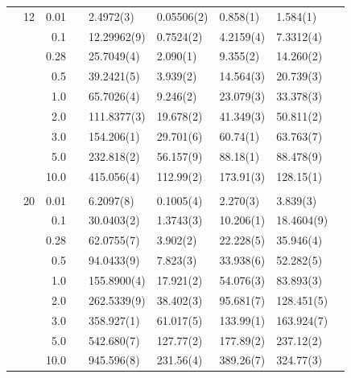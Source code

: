 \begin{table}[H]
\begin{tabularx}{\textwidth}{R{1cm}rrcR{2.3cm}R{2.3cm}R{2.3cm}R{2.3cm}R{1cm}}
		&12 & 0.01 && 2.4972(3) & 0.05506(2) & 0.858(1) & 1.584(1)\\
		&& 0.1 && 12.29962(9) & 0.7524(2) & 4.2159(4) & 7.3312(4) \\
		&& 0.28 && 25.7049(4) & 2.090(1) & 9.355(2) & 14.260(2) \\
		&& 0.5 && 39.2421(5) & 3.939(2) & 14.564(3) & 20.739(3) \\
		&& 1.0 && 65.7026(4) & 9.246(2) & 23.079(3) & 33.378(3) \\
		&& 2.0 && 111.8377(3) & 19.678(2) & 41.349(3) & 50.811(2) \\
		&& 3.0 && 154.206(1) & 29.701(6) & 60.74(1) & 63.763(7) \\ 
		&& 5.0 && 232.818(2) & 56.157(9) & 88.18(1) & 88.478(9) \\
		&& 10.0 && 415.056(4) & 112.99(2) & 173.91(3) & 128.15(1) \\
		\hline \\
		
		&20 & 0.01 && 6.2097(8) & 0.1005(4) & 2.270(3) & 3.839(3) \\
		&& 0.1 && 30.0403(2) & 1.3743(3) & 10.206(1) & 18.4604(9) \\
		&& 0.28 && 62.0755(7) & 3.902(2) & 22.228(5) & 35.946(4) \\
		&& 0.5 && 94.0433(9) & 7.823(3) & 33.938(6) & 52.282(5) \\
		&& 1.0 && 155.8900(4) & 17.921(2) & 54.076(3) & 83.893(3) \\
		&& 2.0 && 262.5339(9) & 38.402(3) & 95.681(7) & 128.451(5) \\
		&& 3.0 && 358.927(1) & 61.017(5) & 133.99(1) & 163.924(7) \\ 
		&& 5.0 && 542.680(7) & 127.77(2) & 177.89(2) & 237.12(2) \\
		&& 10.0 && 945.596(8) & 231.56(4) & 389.26(7) & 324.77(3) \\
		\hline \hline
	\end{tabularx}
\end{table} 

